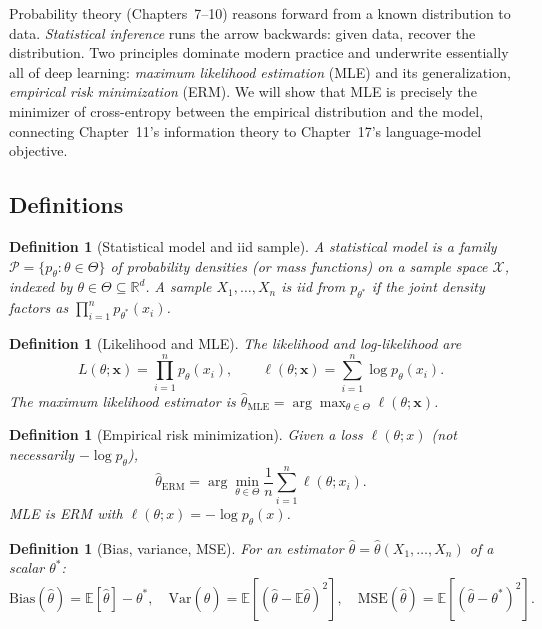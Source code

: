 \documentclass[11pt]{article}
\newtheorem{definition}[theorem]{Definition}
\theoremstyle{remark}
\begin{document}
Probability theory (Chapters~7--10) reasons forward from a known distribution to data. \emph{Statistical inference} runs the arrow backwards: given data, recover the distribution. Two principles dominate modern practice and underwrite essentially all of deep learning: \emph{maximum likelihood estimation} (MLE) and its generalization, \emph{empirical risk minimization} (ERM). We will show that MLE is precisely the minimizer of cross-entropy between the empirical distribution and the model, connecting Chapter~11's information theory to Chapter~17's language-model objective.

\subsection*{Definitions}

\begin{definition}[Statistical model and iid sample]
A \emph{statistical model} is a family $\mathcal{P} = \{p_\theta : \theta \in \Theta\}$ of probability densities (or mass functions) on a sample space $\mathcal{X}$, indexed by $\theta \in \Theta \subseteq \mathbb{R}^d$. A sample $X_1,\dots,X_n$ is \emph{iid} from $p_{\theta^*}$ if the joint density factors as $\prod_{i=1}^n p_{\theta^*}(x_i)$.
\end{definition}

\begin{definition}[Likelihood and MLE]
The \emph{likelihood} and \emph{log-likelihood} are
\[
L(\theta;\mathbf{x}) = \prod_{i=1}^n p_\theta(x_i), \qquad \ell(\theta;\mathbf{x}) = \sum_{i=1}^n \log p_\theta(x_i).
\]
The \emph{maximum likelihood estimator} is $\hat\theta_{\mathrm{MLE}} = \arg\max_{\theta\in\Theta} \ell(\theta;\mathbf{x})$.
\end{definition}

\begin{definition}[Empirical risk minimization]
Given a loss $\ell(\theta;x)$ (not necessarily $-\log p_\theta$),
\[
\hat\theta_{\mathrm{ERM}} = \arg\min_{\theta\in\Theta} \frac{1}{n}\sum_{i=1}^n \ell(\theta;x_i).
\]
MLE is ERM with $\ell(\theta;x) = -\log p_\theta(x)$.
\end{definition}

\begin{definition}[Bias, variance, MSE]
For an estimator $\hat\theta = \hat\theta(X_1,\dots,X_n)$ of a scalar $\theta^*$:
\[
\mathrm{Bias}(\hat\theta) = \mathbb{E}[\hat\theta]-\theta^*, \quad
\mathrm{Var}(\hat\theta) = \mathbb{E}[(\hat\theta-\mathbb{E}\hat\theta)^2], \quad
\mathrm{MSE}(\hat\theta) = \mathbb{E}[(\hat\theta-\theta^*)^2].
\]
\end{definition}
\end{document}
